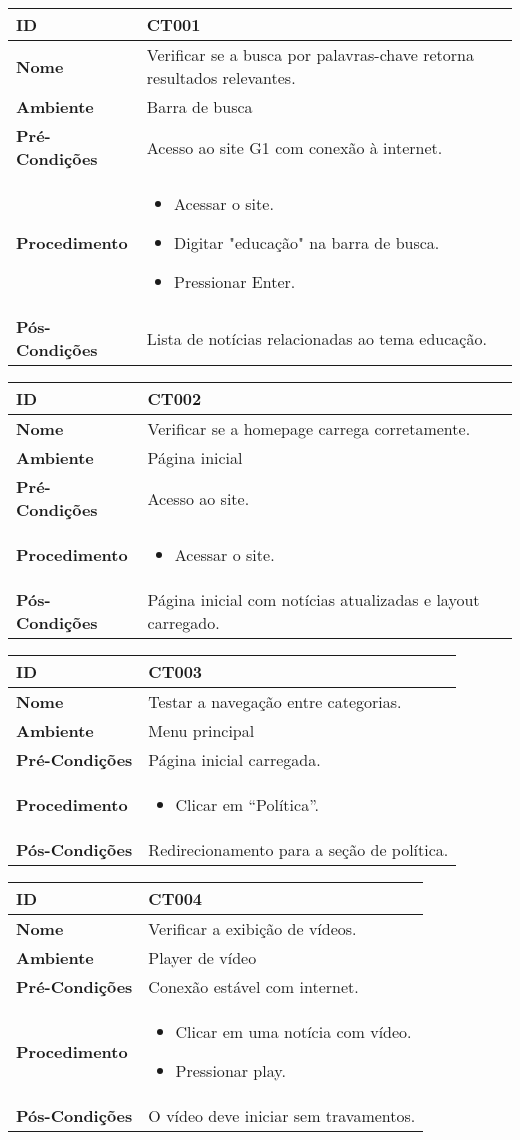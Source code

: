 \documentclass[12pt]{article}
\begin{document}


\newcommand{\casodeteste}[6]{
\begin{center}
\end{center}

\vspace{0.5cm}

\begin{tabular}{|>{\bfseries}p{4cm}|p{10cm}|}
    \hline
    ID & #1 \\
    \hline
    Nome & #2 \\
    \hline
    Ambiente & #3 \\
    \hline
    Pré-Condições & #4 \\
    \hline
    Procedimento & 
    \begin{itemize}[noitemsep,topsep=0pt]
        #5
    \end{itemize} \\
    \hline
    Pós-Condições & #6 \\
    \hline
\end{tabular}

\vspace{1cm}
}


\casodeteste
{CT001}
{Verificar se a busca por palavras-chave retorna resultados relevantes.}
{Barra de busca}
{Acesso ao site G1 com conexão à internet.}
{
\item Acessar o site.
\item Digitar "educação" na barra de busca.
\item Pressionar Enter.
}
{Lista de notícias relacionadas ao tema educação.}

\casodeteste
{CT002}
{Verificar se a homepage carrega corretamente.}
{Página inicial}
{Acesso ao site.}
{
\item Acessar o site.
}
{Página inicial com notícias atualizadas e layout carregado.}

\casodeteste
{CT003}
{Testar a navegação entre categorias.}
{Menu principal}
{Página inicial carregada.}
{
\item Clicar em “Política”.
}
{Redirecionamento para a seção de política.}

\casodeteste
{CT004}
{Verificar a exibição de vídeos.}
{Player de vídeo}
{Conexão estável com internet.}
{
\item Clicar em uma notícia com vídeo.
\item Pressionar play.
}
{O vídeo deve iniciar sem travamentos.}
\end{document}
